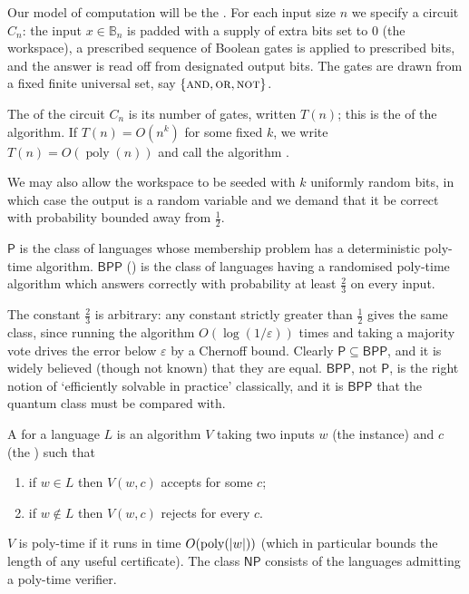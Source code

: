 \documentclass[a4paper]{scrartcl}
\newcommand{\class}[1]{\mathsf{#1}}
\DeclareMathOperator{\poly}{poly}
\newcommand{\bits}[1]{\mathbb{B}_{#1}}
\begin{document}
Our model of computation will be the . For each input size $n$ we specify a circuit $C_n$: the input $x \in\bits n$ is padded with a supply of extra bits set to $0$ (the workspace), a prescribed sequence of Boolean gates is applied to prescribed bits, and the answer is read off from designated output bits. The gates are drawn from a fixed finite universal set, say $\{\textsc{and},\textsc{or},\textsc{not}\}$.

\begin{definition}
	The  of the circuit $C_n$ is its number of gates, written $T(n)$; this is the  of the algorithm. If $T(n) = O(n^k)$ for some fixed $k$, we write $T(n) = O(\poly(n))$ and call the algorithm .
\end{definition}

We may also allow the workspace to be seeded with $k$ uniformly random bits, in which case the output is a random variable and we demand that it be correct with probability bounded away from $\tfrac12$.

\begin{definition}
	$\class{P}$ is the class of languages whose membership problem has a deterministic poly-time algorithm. $\class{BPP}$ () is the class of languages having a randomised poly-time algorithm which answers correctly with probability at least $\tfrac23$ on every input.
\end{definition}

The constant $\tfrac23$ is arbitrary: any constant strictly greater than $\tfrac12$ gives the same class, since running the algorithm $O(\log(1/\varepsilon))$ times and taking a majority vote drives the error below $\varepsilon$ by a Chernoff bound. Clearly $\class{P}\subseteq\class{BPP}$, and it is widely believed (though not known) that they are equal. $\class{BPP}$, not $\class{P}$, is the right notion of `efficiently solvable in practice' classically, and it is $\class{BPP}$ that the quantum class must be compared with.

\begin{definition}[$\class{NP}$]
	A  for a language $L$ is an algorithm $V$ taking two inputs $w$ (the instance) and $c$ (the ) such that
	\begin{enumerate}[label=(\roman*)]
		\item if $w \in L$ then $V(w,c)$ accepts for some $c$;
		\item if $w \notin L$ then $V(w,c)$ rejects for every $c$.
	\end{enumerate}
	$V$ is poly-time if it runs in time $O(\poly(\abs{w}))$ (which in particular bounds the length of any useful certificate). The class $\class{NP}$ consists of the languages admitting a poly-time verifier.
\end{definition}
\end{document}
